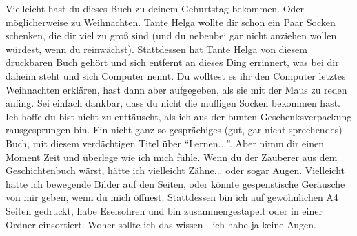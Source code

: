 Vielleicht hast du dieses Buch zu deinem Geburtstag bekommen. Oder möglicherweise zu Weihnachten. Tante Helga wollte dir schon ein Paar Socken schenken, die dir viel zu groß sind (und du nebenbei gar nicht anziehen wollen würdest, wenn du reinwächst). Stattdessen hat Tante Helga von diesem druckbaren Buch gehört und sich entfernt an dieses Ding errinnert, was bei dir daheim steht und sich Computer nennt. Du wolltest es ihr den Computer letztes Weihnachten erklären, hast dann aber aufgegeben, als sie mit der Maus zu reden anfing. Sei einfach dankbar, dass du nicht die muffigen Socken bekommen hast.
Ich hoffe du bist nicht zu enttäuscht, als ich aus der bunten Geschenksverpackung rausgesprungen bin. Ein nicht ganz so gesprächiges (gut, gar nicht sprechendes) Buch, mit diesem verdächtigen Titel über ``Lernen$\ldots$''.
Aber nimm dir einen Moment Zeit und überlege wie ich mich fühle. Wenn du der Zauberer aus dem Geschichtenbuch wärst, hätte ich vielleicht Zähne... oder sogar Augen. Vielleicht hätte ich bewegende Bilder auf den Seiten, oder könnte gespenstische Geräusche von mir geben, wenn du mich öffnest. Stattdessen bin ich auf gewöhnlichen A4 Seiten gedruckt, habe Eselsohren und bin zusammengestapelt oder in einer Ordner einsortiert. Woher sollte ich das wissen---ich habe ja keine Augen. 
\\
\\
